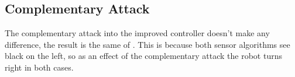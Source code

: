 \subsection{Complementary Attack}

The complementary attack into the improved controller doesn't make any
difference, the result is the same of . This is
because both sensor algorithms see black on the left, so as an effect of the
complementary attack the robot turns right in both cases.
